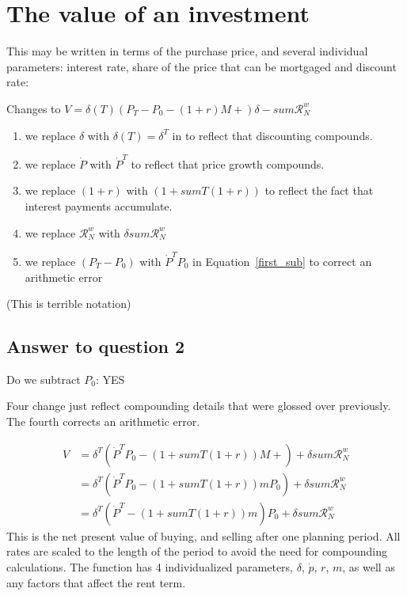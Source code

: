 

\section{The value of an investment}
 
 This may be written in terms of the purchase price, and several individual parameters: interest  rate, share of the price that can be mortgaged and  discount rate: 

 Changes to $V = \delta(T) \left(P_T -P_0- (1+r)M + \right)  \delta-sum\mathcal{R}^w_N $
 \begin{enumerate}
     \item we replace $\delta$ with $\delta(T) = \delta^T$ in  to reflect that discounting compounds. 
     \item we replace $\dot P$ with $\dot P^T$ to reflect that price growth compounds. 
     \item we replace $(1+r)$ with $(1 + sumT(1+r))$ to reflect the fact that interest payments accumulate.  
     \item we replace $\mathcal{R}^w_N$ with $\delta sum\mathcal{R}^w_N$
     \item we replace $(P_T - P_0)$ with $\dot P^T P_0$ in Equation~\ref{first_sub} to correct an arithmetic error
\end{enumerate} 
(This is terrible notation)
\subsection{Answer to question 2} 
Do we subtract $P_0$: YES 

Four change just reflect compounding details that were glossed over previously. The fourth corrects an arithmetic error.

\begin{align}
V &= \delta^T \left(\dot P^T P_0- (1 + sumT(1+r))M +  \right) +\delta sum\mathcal{R}^w_N   \\
&= \delta^T \left(\dot P^T P_0 - (1 + sumT(1+r))mP_0\right)  +      \delta sum\mathcal{R}^w_N \label{first_sub}\\
  &= \delta^T \left(\dot P^T    - (1 + sumT(1+r))m    \right) P_0 + \delta sum\mathcal{R}^w_N 
\end{align}
This is the net present value of buying, and selling after one planning period. All rates are scaled to the length of the period to avoid the need for compounding calculations. The function has 4 individualized  parameters, $\delta$, $\dot p$, $r$, $m$, as well as any factors that affect the rent term.


